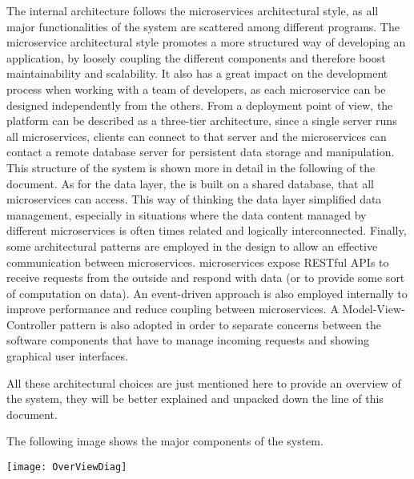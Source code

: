 The internal architecture follows the microservices architectural style, as all major functionalities of the system are scattered among different programs. The microservice architectural style promotes a more structured way of developing an application, by loosely coupling the different components and therefore boost maintainability and scalability. It also has a great impact on the development process when working with a team of developers, as each microservice can be designed independently from the others.
From a deployment point of view, the \app platform can be described as a three-tier architecture, since a single server runs all microservices, clients can connect to that server and the microservices can contact a remote database server for persistent data storage and manipulation. This structure of the system is shown more in detail in the following of the document. 
As for the data layer, the \app is built on a shared database, that all microservices can access. This way of thinking the data layer simplified data management, especially in situations where the data content managed by different microservices is often times related and logically interconnected.
Finally, some architectural patterns are employed in the design to allow an effective communication between microservices. \app microservices expose RESTful APIs to receive requests from the outside and respond with data (or to provide some sort of computation on data). An event-driven approach is also employed internally to improve performance and reduce coupling between microservices.
A Model-View-Controller pattern is also adopted in order to separate concerns between the software components that have to manage incoming requests and showing graphical user interfaces.

All these architectural choices are just mentioned here to provide an overview of the system, they will be better explained and unpacked down the line of this document.


\begin{minipage}{\linewidth}

The following image shows the major components of the \app system.

\texttt{[image: OverViewDiag]}

\end{minipage}
